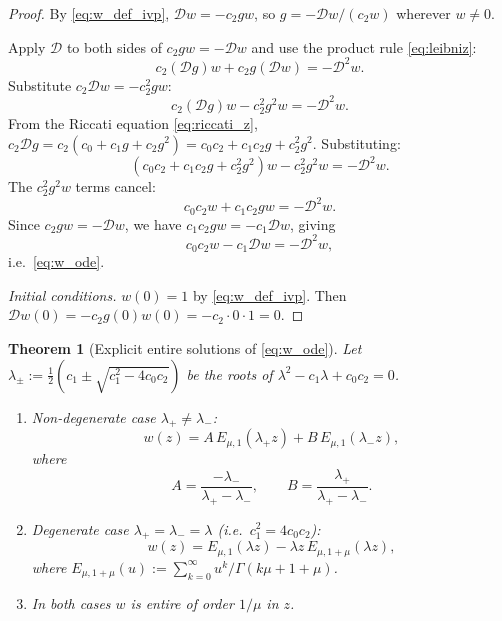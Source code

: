 \documentclass[12pt,a4paper]{amsart}
\newcommand{\assign}{:=}
\newcommand{\ML}[2]{E_{#1,#2}}
\theoremstyle{plain}
\newtheorem{theorem}{Theorem}[section]
\theoremstyle{definition}
\theoremstyle{remark}
\begin{document}
\begin{proof}
By \eqref{eq:w_def_ivp}, $\mathcal{D}w=-c_2 gw$, so
$g=-\mathcal{D}w/(c_2 w)$ wherever $w\ne 0$.

Apply $\mathcal{D}$ to both sides of $c_2 gw = -\mathcal{D}w$ and use the
product rule \eqref{eq:leibniz}:
\[
  c_2(\mathcal{D}g)w + c_2 g(\mathcal{D}w) = -\mathcal{D}^2 w.
\]
Substitute $c_2\mathcal{D}w=-c_2^2 gw$:
\[
  c_2(\mathcal{D}g)w - c_2^2 g^2 w = -\mathcal{D}^2 w.
\]
From the Riccati equation \eqref{eq:riccati_z},
$c_2\mathcal{D}g = c_2(c_0+c_1 g+c_2 g^2) = c_0 c_2+c_1 c_2 g+c_2^2 g^2$.
Substituting:
\[
  (c_0 c_2+c_1 c_2 g+c_2^2 g^2)w - c_2^2 g^2 w = -\mathcal{D}^2 w.
\]
The $c_2^2 g^2 w$ terms cancel:
\[
  c_0 c_2 w + c_1 c_2 g w = -\mathcal{D}^2 w.
\]
Since $c_2 gw=-\mathcal{D}w$, we have $c_1 c_2 gw=-c_1\mathcal{D}w$, giving
\[
  c_0 c_2 w - c_1\mathcal{D}w = -\mathcal{D}^2 w,
\]
i.e.\ \eqref{eq:w_ode}.

\emph{Initial conditions.}
$w(0)=1$ by \eqref{eq:w_def_ivp}. Then
$\mathcal{D}w(0)=-c_2 g(0)w(0)=-c_2\cdot 0\cdot 1=0$.
\end{proof}

\begin{theorem}[Explicit entire solutions of \eqref{eq:w_ode}]\label{thm:w_entire}
Let $\lambda_{\pm}\assign\tfrac{1}{2}(c_1\pm\sqrt{c_1^2-4c_0 c_2})$ be the
roots of $\lambda^2-c_1\lambda+c_0 c_2=0$.

\begin{enumerate}[label=(\roman*)]
\item \emph{Non-degenerate case} $\lambda_+\ne\lambda_-$:
\begin{equation}\label{eq:w_general}
  w(z) = A\,\ML{\mu}{1}(\lambda_+ z) + B\,\ML{\mu}{1}(\lambda_- z),
\end{equation}
where
\begin{equation}\label{eq:AB}
  A = \frac{-\lambda_-}{\lambda_+-\lambda_-},\qquad
  B = \frac{\lambda_+}{\lambda_+-\lambda_-}.
\end{equation}

\item \emph{Degenerate case} $\lambda_+=\lambda_-=\lambda$
(i.e.\ $c_1^2=4c_0 c_2$):
\begin{equation}\label{eq:w_degen}
  w(z) = \ML{\mu}{1}(\lambda z) - \lambda z\,\ML{\mu}{1+\mu}(\lambda z),
\end{equation}
where $\ML{\mu}{1+\mu}(u)\assign\sum_{k=0}^\infty u^k/\Gamma(k\mu+1+\mu)$.

\item In both cases $w$ is entire of order $1/\mu$ in $z$.
\end{enumerate}
\end{theorem}
\end{document}
